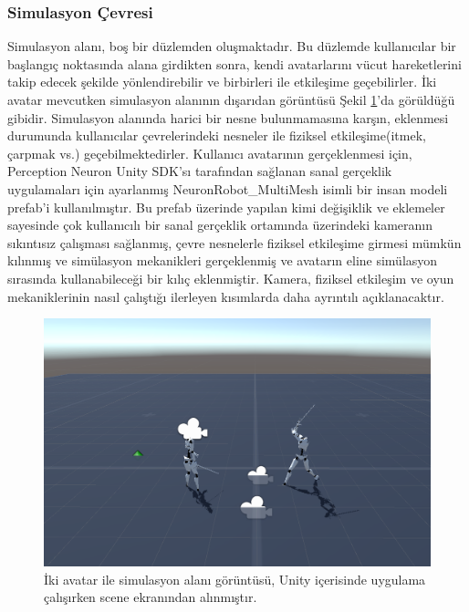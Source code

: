 \documentclass[a4paper, 12pt, titlepage]{article}
\begin{document}
\subsubsection{Simulasyon Çevresi}

Simulasyon alanı, boş bir düzlemden oluşmaktadır. Bu düzlemde kullanıcılar bir başlangıç noktasında
alana girdikten sonra, kendi avatarlarını vücut hareketlerini takip edecek şekilde yönlendirebilir
ve birbirleri ile etkileşime geçebilirler. İki avatar mevcutken simulasyon alanının dışarıdan
görüntüsü Şekil \ref{env}’da görüldüğü gibidir. Simulasyon alanında harici bir nesne bulunmamasına
karşın, eklenmesi durumunda kullanıcılar çevrelerindeki nesneler ile fiziksel etkileşime(itmek,
çarpmak vs.) geçebilmektedirler. Kullanıcı avatarının gerçeklenmesi için, Perception Neuron Unity
SDK’sı tarafından sağlanan sanal gerçeklik uygulamaları için ayarlanmış NeuronRobot\_MultiMesh isimli
bir insan modeli prefab’i kullanılmıştır. Bu prefab üzerinde yapılan kimi değişiklik ve eklemeler
sayesinde çok kullanıcılı bir sanal gerçeklik ortamında üzerindeki kameranın sıkıntısız çalışması
sağlanmış, çevre nesnelerle fiziksel etkileşime girmesi mümkün kılınmış ve simülasyon mekanikleri
gerçeklenmiş ve avatarın eline simülasyon sırasında kullanabileceği bir kılıç eklenmiştir. Kamera,
fiziksel etkileşim ve oyun mekaniklerinin nasıl çalıştığı ilerleyen kısımlarda daha ayrıntılı
açıklanacaktır.

\begin{figure}
    \centering
        \includegraphics[width=6in]{images/env}
    \caption{İki avatar ile simulasyon alanı görüntüsü, Unity içerisinde uygulama çalışırken scene
             ekranından alınmıştır.}
    \label{env}
\end{figure}
\end{document}

